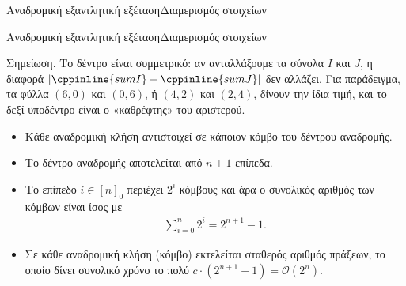 \documentclass[t,aspectratio=169,9pt]{beamer}
\begin{document}
\begin{frame}{Αναδρομική εξαντλητική εξέταση}{Διαμερισμός στοιχείων}
\pdpskipbuttons   %
\end{frame}

\begin{frame}[fragile]{Αναδρομική εξαντλητική εξέταση}{Διαμερισμός στοιχείων}
    \begin{noteblock}{Σημείωση.}
        Το δέντρο είναι συμμετρικό: αν ανταλλάξουμε τα σύνολα $I$ και $J$, η διαφορά
        \mbox{$|\cppinline{sumI} - \cppinline{sumJ}|$} δεν αλλάζει. Για παράδειγμα, τα φύλλα $(6, 0)$ και $(0, 6)$,
        ή $(4, 2)$ και $(2, 4)$, δίνουν την ίδια τιμή, και το δεξί υποδέντρο είναι ο «καθρέφτης» του
        αριστερού. 

    \end{noteblock}
    \vspace{0.25cm}
    \pause
    \begin{itemize}
      \pause
      \item Κάθε αναδρομική κλήση αντιστοιχεί σε κάποιον κόμβο του δέντρου αναδρομής.
      \pause
      \item Το δέντρο αναδρομής αποτελείται από $n + 1$ επίπεδα.
      \pause
      \item Το επίπεδο $i \in [n]_0$ περιέχει $2^i$ κόμβους και άρα ο συνολικός αριθμός των κόμβων είναι ίσος με 
      \begin{align*}
          \sum_{i = 0}^{n} 2^i = 2^{n + 1} - 1.
      \end{align*}
      \pause
      \item Σε κάθε αναδρομική κλήση (κόμβο) εκτελείται σταθερός αριθμός πράξεων, το οποίο δίνει συνολικό χρόνο το πολύ $c \cdot (2^{n + 1} - 1) = \mathcal{O}(2^n)$.
    \end{itemize}
\end{frame}
\end{document}
